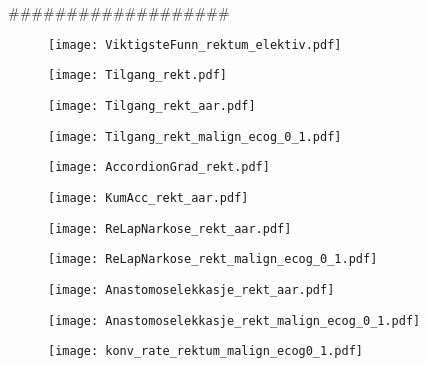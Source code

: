\documentclass[norsk,a4paper]{article}\usepackage[]{graphicx}\usepackage[]{color}
\begin{document}
###################




\begin{figure}[ht]
\centering
\texttt{[image: ViktigsteFunn\_rektum\_elektiv.pdf]}
\caption{}
\end{figure}

\begin{figure}[ht]
\centering
\texttt{[image: Tilgang\_rekt.pdf]}
\caption{}
\end{figure}

\begin{figure}[ht]
\centering
\texttt{[image: Tilgang\_rekt\_aar.pdf]}
\caption{}
\end{figure}

\begin{figure}[ht]
\centering
\texttt{[image: Tilgang\_rekt\_malign\_ecog\_0\_1.pdf]}
\caption{}
\end{figure}

\begin{figure}[ht]
\centering
\texttt{[image: AccordionGrad\_rekt.pdf]}
\caption{}
\end{figure}

\begin{figure}[ht]
\centering
\texttt{[image: KumAcc\_rekt\_aar.pdf]}
\caption{}
\end{figure}

\clearpage

\begin{figure}[ht]
\centering
\texttt{[image: ReLapNarkose\_rekt\_aar.pdf]}
\caption{}
\end{figure}

\begin{figure}[ht]
\centering
\texttt{[image: ReLapNarkose\_rekt\_malign\_ecog\_0\_1.pdf]}
\caption{}
\end{figure}

\begin{figure}[ht]
\centering
\texttt{[image: Anastomoselekkasje\_rekt\_aar.pdf]}
\caption{}
\end{figure}

\begin{figure}[ht]
\centering
\texttt{[image: Anastomoselekkasje\_rekt\_malign\_ecog\_0\_1.pdf]}
\caption{}
\end{figure}

\begin{figure}[ht]
\centering
\texttt{[image: konv\_rate\_rektum\_malign\_ecog0\_1.pdf]}
\caption{}
\end{figure}
\end{document}
